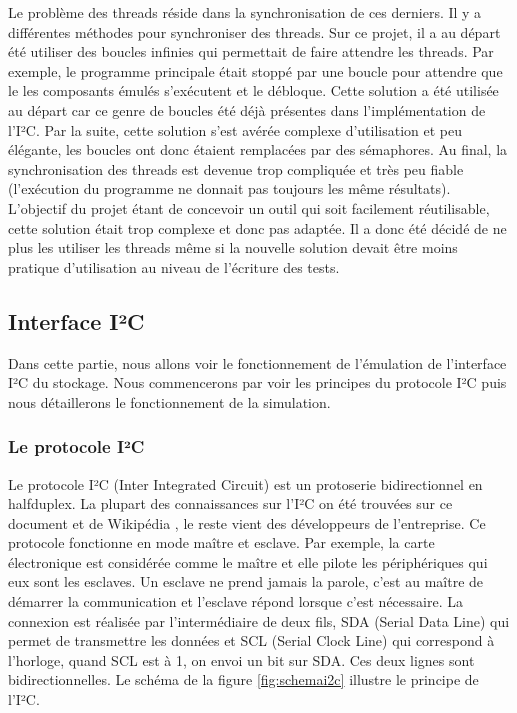 \documentclass[a4paper]{article}
\begin{document}
Le problème des threads réside dans la synchronisation de ces derniers. Il y a
différentes méthodes pour synchroniser des threads. Sur ce projet, il a au
départ été utiliser des boucles infinies qui permettait de faire attendre les
threads. Par exemple, le programme principale était stoppé par une boucle pour
attendre que le les composants émulés s'exécutent et le débloque. Cette solution
a été utilisée au départ car ce genre de boucles été déjà présentes dans
l'implémentation de l'I²C. Par la suite, cette solution s'est avérée complexe
d'utilisation et peu élégante, les boucles ont donc étaient remplacées par des %
sémaphores. Au final, la synchronisation des threads est devenue trop compliquée
et très peu fiable (l'exécution du programme ne donnait pas toujours les même
résultats). L'objectif du projet étant de concevoir un outil qui soit facilement
réutilisable, cette solution était trop complexe et donc pas adaptée. Il a donc
été décidé de ne plus les utiliser les threads même si la nouvelle solution
devait être moins pratique d'utilisation au niveau de l'écriture des tests.
\subsection{Interface I²C}%

Dans cette partie, nous allons voir le fonctionnement de l'émulation de
l'interface I²C du stockage. Nous commencerons par voir les principes du
protocole I²C puis nous détaillerons le fonctionnement de la simulation.

\subsubsection*{Le protocole I²C}

Le protocole I²C (Inter Integrated Circuit) est un \gls{protoserie}
bidirectionnel en \gls{halfduplex}. La plupart des connaissances sur l'I²C on
été trouvées sur ce document \cite{mankar2014review} et de Wikipédia
\cite{frwiki:197726464}, le reste vient des développeurs de l'entreprise. Ce
protocole fonctionne en mode maître et esclave. Par exemple, la carte
électronique est considérée comme le maître et elle pilote les périphériques qui
eux sont les esclaves. Un esclave ne prend jamais la parole, c'est au maître de
démarrer la communication et l'esclave répond lorsque c'est nécessaire. La
connexion est réalisée par l'intermédiaire de deux fils, SDA (Serial Data Line)
qui permet de transmettre les données et SCL (Serial Clock Line) qui correspond
à l'horloge, quand SCL est à 1, on envoi un bit sur SDA. Ces deux lignes sont
bidirectionnelles. Le schéma de la figure \ref{fig:schemai2c} illustre le
principe de l'I²C.
\end{document}
